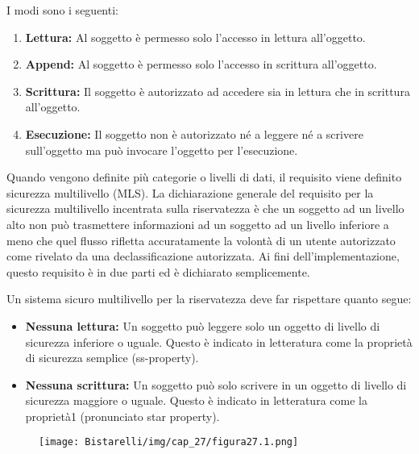 \singlespacing

I modi sono i seguenti:

\begin{enumerate}
    \item \textbf{Lettura:}
    Al soggetto è permesso solo l'accesso in lettura all'oggetto.
    
    \item \textbf{Append:}
    Al soggetto è permesso solo l'accesso in scrittura all'oggetto.
    
    \item \textbf{Scrittura:}
    Il soggetto è autorizzato ad accedere sia in lettura che in scrittura all'oggetto.
    
    \item \textbf{Esecuzione:}
    Il soggetto non è autorizzato né a leggere né a scrivere sull'oggetto ma può invocare l'oggetto per l'esecuzione.
\end{enumerate}

Quando vengono definite più categorie o livelli di dati, il requisito viene definito sicurezza multilivello (MLS). La dichiarazione generale del requisito per la sicurezza multilivello incentrata sulla riservatezza è che un soggetto ad un livello alto non può trasmettere informazioni ad un soggetto ad un livello inferiore a meno che quel flusso rifletta accuratamente la volontà di un utente autorizzato come rivelato da una declassificazione autorizzata. Ai fini dell'implementazione, questo requisito è in due parti ed è dichiarato semplicemente.

\singlespacing

Un sistema sicuro multilivello per la riservatezza deve far rispettare quanto segue:

\begin{itemize}
    \item \textbf{Nessuna lettura:} Un soggetto può leggere solo un oggetto di livello di sicurezza inferiore o uguale. Questo è indicato in letteratura come la proprietà di sicurezza semplice (ss-property).
    
    \item \textbf{Nessuna scrittura:} Un soggetto può solo scrivere in un oggetto di livello di sicurezza maggiore o uguale. Questo è indicato in letteratura come la proprietà1 (pronunciato star property).
\end{itemize}

\begin{figure}[H]
	\centering
    \texttt{[image: Bistarelli/img/cap\_27/figura27.1.png]}
\end{figure}

